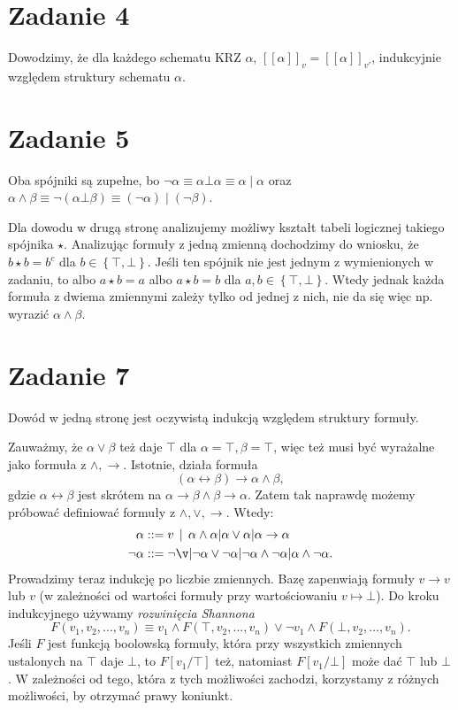 \section*{Zadanie 4}

Dowodzimy, że dla każdego schematu KRZ \( \alpha \), \( [[\alpha ]]_v = [[\alpha ]]_{v'} \), indukcyjnie względem struktury schematu \( \alpha \).

\section*{Zadanie 5} 

Oba spójniki są zupełne, bo \( \neg \alpha \equiv \alpha \bot \alpha \equiv \alpha \mid \alpha \) oraz \( \alpha \wedge \beta \equiv \neg (\alpha \bot \beta) \equiv (\neg \alpha) \mid (\neg \beta) \).

Dla dowodu w drugą stronę analizujemy możliwy kształt tabeli logicznej takiego spójnika \( \star \). Analizując formuły z jedną zmienną dochodzimy do wniosku, że \( b \star b = b^c \) dla \( b \in \left\{ \top, \bot \right\} \). Jeśli ten spójnik nie jest jednym z wymienionych w zadaniu, to albo \( a \star b = a \) albo \( a \star b = b \) dla \( a, b \in \left\{ \top, \bot \right\} \). Wtedy jednak każda formuła z dwiema zmiennymi zależy tylko od jednej z nich, nie da się więc np. wyrazić \( \alpha \wedge \beta \).

\section*{Zadanie 7}

Dowód w jedną stronę jest oczywistą indukcją względem struktury formuły.

Zauważmy, że \( \alpha \vee \beta \) też daje \( \top \) dla \( \alpha = \top, \beta = \top \), więc też musi być wyrażalne jako formuła z \( \wedge, \to \). Istotnie, działa formuła
\[ 
    (\alpha \leftrightarrow \beta) \to \alpha \wedge \beta,
\]
gdzie \(\alpha \leftrightarrow \beta\) jest skrótem na \( \alpha \to \beta \wedge \beta \to \alpha \). Zatem tak naprawdę możemy próbować definiować formuły z \( \wedge, \vee, \to \). Wtedy:
\begin{align*}
    \alpha &::= v\,\mid\, \alpha \wedge \alpha | \alpha \vee \alpha | \alpha \to \alpha \\
    \neg\alpha &::= \neg \v | \neg\alpha \vee \neg\alpha | \neg\alpha \wedge \neg\alpha | \alpha \wedge \neg\alpha.
\end{align*}
Prowadzimy teraz indukcję po liczbie zmiennych. Bazę zapenwiają formuły \( v \to v \) lub \( v \) (w zależności od wartości formuły przy wartościowaniu \( v \mapsto \bot \)). Do kroku indukcyjnego używamy \textit{rozwinięcia Shannona}
\[ 
    F(v_1, v_2, \ldots, v_n) \equiv v_1 \wedge F(\top, v_2, \ldots, v_n) \vee \neg v_1 \wedge F(\bot, v_2, \ldots, v_n).
\]
Jeśli \( F \) jest funkcją boolowską formuły, która przy wszystkich zmiennych ustalonych na \( \top \) daje \( \bot \), to \( F[v_1/\top] \) też, natomiast \( F[v_1/\bot] \) może dać \( \top \) lub \( \bot \). W zależności od tego, która z tych możliwości zachodzi, korzystamy z różnych możliwości, by otrzymać prawy koniunkt.

